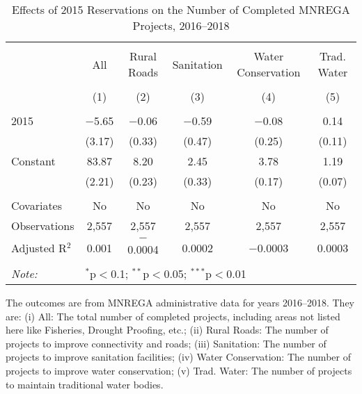 \begin{table}[!htbp]
\centering
\begin{threeparttable}

  \caption{Effects of 2015 Reservations on the Number of Completed MNREGA Projects, 2016--2018} 
  \label{main_mnrega_15} 
\scriptsize 
\begin{tabular}{@{\extracolsep{0pt}}lccccc} 
\\[-1.8ex]\hline 
\hline \\[-1.8ex] 
 & All & Rural Roads & Sanitation & Water Conservation & Trad. Water \\ 
\\[-1.8ex] & (1) & (2) & (3) & (4) & (5)\\ 
\hline \\[-1.8ex] 
 2015 & $-$5.65 & $-$0.06 & $-$0.59 & $-$0.08 & 0.14 \\ 
  & (3.17) & (0.33) & (0.47) & (0.25) & (0.11) \\ 
  Constant & 83.87 & 8.20 & 2.45 & 3.78 & 1.19 \\ 
  & (2.21) & (0.23) & (0.33) & (0.17) & (0.07) \\ 
 \hline \\[-1.8ex] 
Covariates & No & No & No & No & No \\ 
Observations & 2,557 & 2,557 & 2,557 & 2,557 & 2,557 \\ 
Adjusted R$^{2}$ & 0.001 & $-$0.0004 & 0.0002 & $-$0.0003 & 0.0003 \\ 
\hline 
\hline \\[-1.8ex] 
\textit{Note:}  & \multicolumn{5}{l}{$^{*}$p$<$0.1; $^{**}$p$<$0.05; $^{***}$p$<$0.01} \\ 
\end{tabular} 
\begin{tablenotes}[flushleft]
\scriptsize
\item The outcomes are from MNREGA administrative data for years 2016--2018. They are: 
(i) All: The total number of completed projects, including areas not listed here like Fisheries, Drought Proofing, etc.;
(ii) Rural Roads: The number of projects to improve connectivity and roads;
(iii) Sanitation: The number of projects to improve sanitation facilities;
(iv) Water Conservation: The number of projects to improve water conservation;
(v) Trad. Water: The number of projects to maintain traditional water bodies.
\end{tablenotes}
\end{threeparttable}
\end{table}
